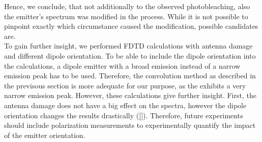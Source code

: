 					Hence, we conclude, that not additionally to the observed photobleaching, also the emitter's spectrum was modified in the \pp process.
					While it is not possible to pinpoint exactly which circumstance caused the modification, possible candidates are.
					\\
					To gain further insight, we performed FDTD calculations with antenna damage and different dipole orientation.
					To be able to include the dipole orientation into the calculations, a dipole emitter with a broad emission instead of a narrow emission peak has to be used.
					Therefore, the convolution method as described in the previsous section is more adequate for our purpose, as the \siv exhibits a very narrow emission peak.
					However, these calculations give further insight.
					First, the antenna damage does not have a big effect on the spectra, however the dipole orientation changes the results drastically (\cref{}).
					Therefore, future experiments should include polarization measurements to experimentally quantify the impact of the emitter orientation.

